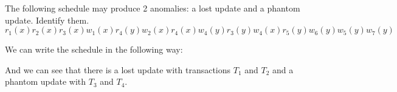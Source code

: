 \documentclass[12pt, a4paper]{report}
\newtheorem[style=M,bodystyle=\normalfont]{theorem}{Theorem}
\newtheorem[style=M,bodystyle=\normalfont]{corollary}{Corollary}
\newtheorem[style=M,bodystyle=\normalfont]{lemma}{Lemma}
\newtheorem[style=M,bodystyle=\normalfont]{definition}{Definition}
\begin{document}
    \begin{Exercise}[label=2]
        The following schedule may produce 2 anomalies: a lost update and a phantom update. Identify them. 
        \[r_1(x) r_2(x) r_3(x) w_1(x) r_4(y) w_2(x) r_4(x) w_4(y) r_3(y)w_4(x) r_5(y) w_6(y) w_5(y) w_7(y)\]
    \end{Exercise}
    \begin{Answer}[ref=2]
        We can write the schedule in the following way:
    \begin{table}[H]
        \centering
    \end{table}
        And we can see that there is a lost update with transactions $T_1$ and $T_2$ and a phantom update with $T_3$ and $T_4$. 
    \end{Answer}
\end{document}
